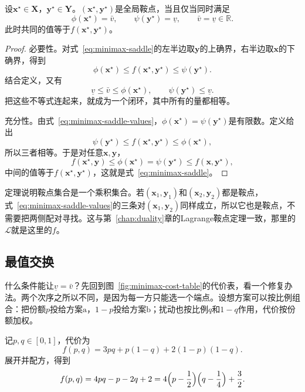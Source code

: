 \begin{theorem}[鞍点与最值相等]
\label{thm:minimax-saddle-values}
设$\bm{x}^\star\in\bm{X}$，$\bm{y}^\star\in\bm{Y}$。$(\bm{x}^\star,\bm{y}^\star)$是全局鞍点，当且仅当同时满足
\begin{equation}
 \phi(\bm{x}^\star)=\bar{v},\qquad\psi(\bm{y}^\star)=\underline{v},\qquad\bar{v}=\underline{v}\in\mathbb{R}.
 \label{eq:minimax-saddle-values}
\end{equation}
此时共同的值等于$f(\bm{x}^\star,\bm{y}^\star)$。
\end{theorem}

\begin{proof}
必要性。对式~\eqref{eq:minimax-saddle}的左半边取$\bm{y}$的上确界，右半边取$\bm{x}$的下确界，得到
\[
 \phi(\bm{x}^\star)\leq f(\bm{x}^\star,\bm{y}^\star)\leq\psi(\bm{y}^\star).
\]
结合定义，又有
\[
 \underline{v}\leq\bar{v}\leq\phi(\bm{x}^\star),\qquad\psi(\bm{y}^\star)\leq\underline{v}.
\]
把这些不等式连起来，就成为一个闭环，其中所有的量都相等。

充分性。由式~\eqref{eq:minimax-saddle-values}，$\phi(\bm{x}^\star)=\psi(\bm{y}^\star)$是有限数。定义给出
\[
 \psi(\bm{y}^\star)\leq f(\bm{x}^\star,\bm{y}^\star)\leq\phi(\bm{x}^\star),
\]
所以三者相等。于是对任意$\bm{x},\bm{y}$，
\[
 f(\bm{x}^\star,\bm{y})\leq\phi(\bm{x}^\star)=\psi(\bm{y}^\star)\leq f(\bm{x},\bm{y}^\star),
\]
中间的值等于$f(\bm{x}^\star,\bm{y}^\star)$，这就是式~\eqref{eq:minimax-saddle}。
\end{proof}

定理说明鞍点集合是一个乘积集合。若$(\bm{x}_1,\bm{y}_1)$和$(\bm{x}_2,\bm{y}_2)$都是鞍点，式~\eqref{eq:minimax-saddle-values}的三条对$(\bm{x}_1,\bm{y}_2)$同样成立，所以它也是鞍点，不需要把两侧配对寻找。这与第~\ref{chap:duality}章的Lagrange鞍点定理一致，那里的$\mathcal{L}$就是这里的$f$。

\subsection{最值交换}
\label{sec:minimax-exchange}

什么条件能让$\underline{v}=\bar{v}$？先回到图~\ref{fig:minimax-cost-table}的代价表，看一个修复办法。两个次序之所以不同，是因为每一方只能选一个端点。设想方案可以按比例组合：把份额$p$投给方案$\mathrm{a}$，$1-p$投给方案$\mathrm{b}$；扰动也按比例$q$和$1-q$作用，代价按份额加权。

记$p,q\in[0,1]$，代价为
\[
 f(p,q)=3pq+p(1-q)+2(1-p)(1-q).
\]
展开并配方，得到
\begin{equation}
 f(p,q)=4pq-p-2q+2=4\Bigl(p-\frac12\Bigr)\Bigl(q-\frac14\Bigr)+\frac32.
 \label{eq:minimax-relaxed}
\end{equation}


